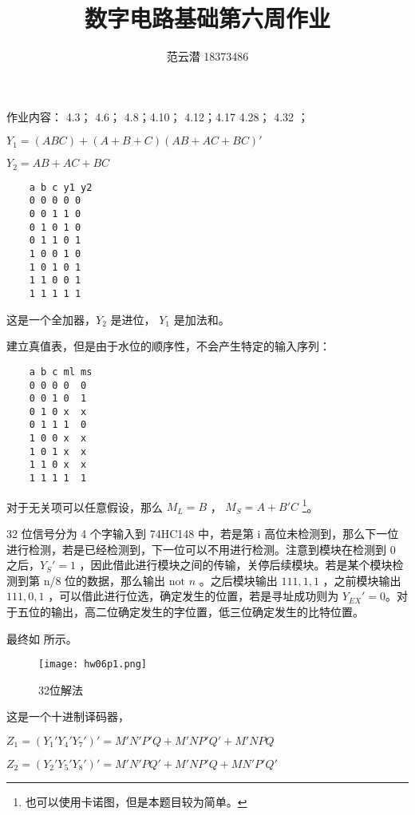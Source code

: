 \documentclass[lang=cn,11pt,a4paper,cite=authoryear,twocolumn]{elegantpaper}
\title{数字电路基础\quad 第六周作业}
\author{范云潜 18373486}
\institute{微电子学院 184111 班}
\date{\zhtoday}
\begin{document}
\maketitle

作业内容：
4.3；
4.6；
4.8；4.10；
4.12；4.17
4.28；
4.32 ；


\(Y_1 = (ABC)+(A+B+C)(AB+AC+BC)'\) 

\(Y_2 = AB + AC + BC\) 

\begin{lstlisting}
    a b c y1 y2
    0 0 0 0 0
    0 0 1 1 0
    0 1 0 1 0
    0 1 1 0 1
    1 0 0 1 0
    1 0 1 0 1
    1 1 0 0 1
    1 1 1 1 1
\end{lstlisting}

这是一个全加器，\(Y_2\) 是进位， \(Y_1\) 是加法和。


建立真值表，但是由于水位的顺序性，不会产生特定的输入序列：

\begin{lstlisting}
    a b c ml ms 
    0 0 0 0  0
    0 0 1 0  1
    0 1 0 x  x
    0 1 1 1  0
    1 0 0 x  x
    1 0 1 x  x 
    1 1 0 x  x
    1 1 1 1  1
\end{lstlisting}

对于无关项可以任意假设，那么 \(M_L = B\) ， \(M_S = A + B'C\) \footnote{也可以使用卡诺图，但是本题目较为简单。}。


32 位信号分为 4 个字输入到 74HC148 中，若是第 i 高位未检测到，那么下一位进行检测，若是已经检测到，下一位可以不用进行检测。注意到模块在检测到 0 之后，\(Y_S' = 1\) ，因此借此进行模块之间的传输，关停后续模块。若是某个模块检测到第 n/8 位的数据，那么输出 \(\text{not } n\) 。之后模块输出 \(111, 1,1\) ，之前模块输出 \(111, 0,1\) ，可以借此进行位选，确定发生的位置，若是寻址成功则为 \(Y_{EX}' = 0 \)。对于五位的输出，高二位确定发生的字位置，低三位确定发生的比特位置。

最终如  所示。

\begin{figure*}[!htb]
    \centering
    \texttt{[image: hw06p1.png]}
    \caption{32位解法}
    \label{01}
\end{figure*}


这是一个十进制译码器，

\(Z_1 = (Y_1' Y_4' Y_7')' = M'N'P'Q + M'NP'Q' + M'NPQ\)

\(Z_2 = (Y_2' Y_5' Y_8')' = M'N'PQ' + M'NP'Q + MN'P'Q'\)
\end{document}
